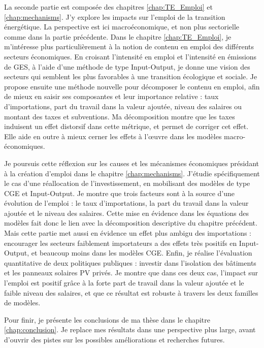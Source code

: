 La seconde partie est composée des chapitres \ref{chap:TE_Emploi} et \ref{chap:mechanisms}. J'y explore les impacts sur l'emploi de la transition énergétique. La perspective est ici macroéconomique, et non plus sectorielle comme dans la partie précédente.
Dans le chapitre \ref{chap:TE_Emploi}, je m'intéresse plus particulièrement à la notion de contenu en emploi des différents secteurs économiques. En croisant l'intensité en emploi et l'intensité en émissions de GES, à l'aide d'une méthode de type Input-Output, je donne une vision des secteurs qui semblent les plus favorables à une transition écologique et sociale. Je propose ensuite une méthode nouvelle pour décomposer le contenu en emploi, afin de mieux en saisir ses composantes et leur importance relative : taux d'importations, part du travail dans la valeur ajoutée, niveau des salaires ou montant des taxes et subventions. Ma décomposition montre que les taxes induisent un effet distorsif dans cette métrique, et permet de corriger cet effet. Elle aide en outre à mieux cerner les effets à l'\oe{}uvre dans les modèles macro-économiques.

Je poursuis cette réflexion sur les causes et les mécanismes économiques présidant à la création d'emploi dans le chapitre \ref{chap:mechanisms}. J'étudie spécifiquement le cas d'une réallocation de l'investissement, en mobilisant des modèles de type CGE et Input-Output. Je montre que trois facteurs sont à la source d'une évolution de l'emploi : le taux d'importations, la part du travail dans la valeur ajoutée et le niveau des salaires. Cette mise en évidence dans les équations des modèles fait donc le lien avec la décomposition descriptive du chapitre précédent. Mais cette partie met aussi en évidence un effet plus ambigu des importations : encourager les secteurs faiblement importateurs a des effets très positifs en Input-Output, et beaucoup moins dans les modèles CGE. Enfin, je réalise l'évaluation quantitative de deux politiques publiques : investir dans l'isolation des bâtiments et les panneaux solaires PV privés. Je montre que dans ces deux cas, l'impact sur l'emploi est positif grâce à la forte part de travail dans la valeur ajoutée et le faible niveau des salaires, et que ce résultat est robuste à travers les deux familles de modèles. 

Pour finir, je présente les conclusions de ma thèse dans le chapitre \ref{chap:conclusion}. Je replace mes résultats dans une perspective plus large, avant d'ouvrir des pistes sur les possibles améliorations et recherches futures.





